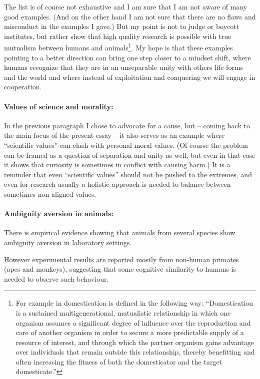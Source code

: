 \documentclass{article}
\begin{document}
The list is of course not exhaustive and I am sure that I am not aware of many good examples. (And on the other hand I am not sure that there are no flaws and misconduct in the examples I gave.) But my point is not to judge or boycott institutes, but rather show that high quality research is possible with true mutualism between humans and animals\footnote{For example in \cite{paper:Domestication} domestication is defined in the following way: ``Domestication is a sustained multigenerational, mutualistic relationship in which one organism assumes a significant degree of influence over the reproduction and care of another
organism in order to secure a more predictable supply of a resource of interest, and through which the partner organism gains advantage over individuals that remain outside this relationship, thereby benefitting and often increasing the fitness of both the domesticator and the target domesticate.''}. My hope is that these examples pointing to a better direction can bring one step closer to a mindset shift, where humans recognize that they are in an unseparable unity with others life forms and the world and where instead of exploitation and conquering we will engage in cooperation.

\paragraph{Values of science and morality:}
In the previous paragraph I chose to advocate for a cause, but -- coming back to the main focus of the present essay -- it also serves as an example where ``scientific values'' can clash with personal moral values.
(Of course the problem can be framed as a question of separation and unity as well, but even in that case it shows that curiosity is sometimes in conflict with causing harm.)
It is a reminder that even ``scientific values'' should not be pushed to the extremes, and even for research usually a holistic approach is needed to balance between sometimes non-aligned values.

\paragraph{Ambiguity aversion in animals:}

There is empirical evidence showing that animals from several species show ambiguity aversion in laboratory settings.

However experimental results are reported mostly from non-human primates (apes and monkeys), suggesting that some cognitive similarity to humans is needed to observe such behaviour.
\end{document}
